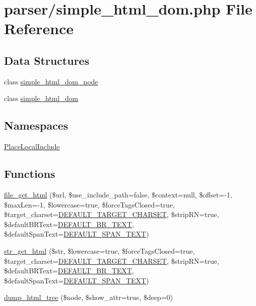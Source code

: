 \hypertarget{simple__html__dom_8php}{\section{parser/simple\+\_\+html\+\_\+dom.php File Reference}
\label{simple__html__dom_8php}
}
\subsection*{Data Structures}
\begin{DoxyCompactItemize}
\item 
class \hyperlink{classsimple__html__dom__node}{simple\+\_\+html\+\_\+dom\+\_\+node}
\item 
class \hyperlink{classsimple__html__dom}{simple\+\_\+html\+\_\+dom}
\end{DoxyCompactItemize}
\subsection*{Namespaces}
\begin{DoxyCompactItemize}
\item 
 \hyperlink{namespace_place_local_include}{Place\+Local\+Include}
\end{DoxyCompactItemize}
\subsection*{Functions}
\begin{DoxyCompactItemize}
\item 
\hyperlink{simple__html__dom_8php_af2164941db8b68168c1105687e179d27}{file\+\_\+get\+\_\+html} (\$url, \$use\+\_\+include\+\_\+path=false, \$context=null, \$offset=-\/1, \$max\+Len=-\/1, \$lowercase=true, \$force\+Tags\+Closed=true, \$target\+\_\+charset=\hyperlink{simple__html__dom_8php_aeb01f6d83a65d695ad327473f838319a}{D\+E\+F\+A\+U\+L\+T\+\_\+\+T\+A\+R\+G\+E\+T\+\_\+\+C\+H\+A\+R\+S\+E\+T}, \$strip\+R\+N=true, \$default\+B\+R\+Text=\hyperlink{simple__html__dom_8php_a898bdf60fe4d05c1c50013eed5e2c6e8}{D\+E\+F\+A\+U\+L\+T\+\_\+\+B\+R\+\_\+\+T\+E\+X\+T}, \$default\+Span\+Text=\hyperlink{simple__html__dom_8php_a30d58d7d3a53efc61f064b53a434bafe}{D\+E\+F\+A\+U\+L\+T\+\_\+\+S\+P\+A\+N\+\_\+\+T\+E\+X\+T})
\item 
\hyperlink{simple__html__dom_8php_a2a9c7626f0cb0a56eb81709124a08922}{str\+\_\+get\+\_\+html} (\$str, \$lowercase=true, \$force\+Tags\+Closed=true, \$target\+\_\+charset=\hyperlink{simple__html__dom_8php_aeb01f6d83a65d695ad327473f838319a}{D\+E\+F\+A\+U\+L\+T\+\_\+\+T\+A\+R\+G\+E\+T\+\_\+\+C\+H\+A\+R\+S\+E\+T}, \$strip\+R\+N=true, \$default\+B\+R\+Text=\hyperlink{simple__html__dom_8php_a898bdf60fe4d05c1c50013eed5e2c6e8}{D\+E\+F\+A\+U\+L\+T\+\_\+\+B\+R\+\_\+\+T\+E\+X\+T}, \$default\+Span\+Text=\hyperlink{simple__html__dom_8php_a30d58d7d3a53efc61f064b53a434bafe}{D\+E\+F\+A\+U\+L\+T\+\_\+\+S\+P\+A\+N\+\_\+\+T\+E\+X\+T})
\item 
\hyperlink{simple__html__dom_8php_a1f67414b1908776b16f3fc8c6953c13f}{dump\+\_\+html\+\_\+tree} (\$node, \$show\+\_\+attr=true, \$deep=0)
\end{DoxyCompactItemize}
